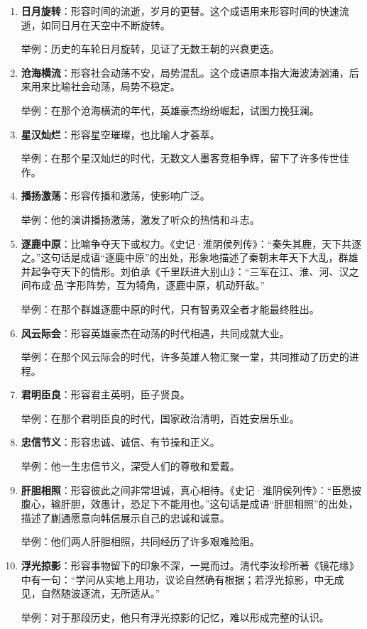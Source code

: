 \begin{enumerate}[leftmargin=*]
    \item \textbf{日月旋转}：形容时间的流逝，岁月的更替。这个成语用来形容时间的快速流逝，如同日月在天空中不断旋转。
    
    举例：历史的车轮日月旋转，见证了无数王朝的兴衰更迭。
    
    \item \textbf{沧海横流}：形容社会动荡不安，局势混乱。这个成语原本指大海波涛汹涌，后来用来比喻社会动荡，局势不稳定。
    
    举例：在那个沧海横流的年代，英雄豪杰纷纷崛起，试图力挽狂澜。
    
    \item \textbf{星汉灿烂}：形容星空璀璨，也比喻人才荟萃。
    
    举例：在那个星汉灿烂的时代，无数文人墨客竞相争辉，留下了许多传世佳作。
    
    \item \textbf{播扬激荡}：形容传播和激荡，使影响广泛。
    
    举例：他的演讲播扬激荡，激发了听众的热情和斗志。
    
    \item \textbf{逐鹿中原}：比喻争夺天下或权力。《史记·淮阴侯列传》：“秦失其鹿，天下共逐之。”这句话是成语“逐鹿中原”的出处，形象地描述了秦朝末年天下大乱，群雄并起争夺天下的情形。刘伯承《千里跃进大别山》：“三军在江、淮、河、汉之间布成‘品’字形阵势，互为犄角，逐鹿中原，机动歼敌。”
    
    举例：在那个群雄逐鹿中原的时代，只有智勇双全者才能最终胜出。
    
    \item \textbf{风云际会}：形容英雄豪杰在动荡的时代相遇，共同成就大业。
    
    举例：在那个风云际会的时代，许多英雄人物汇聚一堂，共同推动了历史的进程。
    
    \item \textbf{君明臣良}：形容君主英明，臣子贤良。
    
    举例：在那个君明臣良的时代，国家政治清明，百姓安居乐业。
    
    \item \textbf{忠信节义}：形容忠诚、诚信、有节操和正义。
    
    举例：他一生忠信节义，深受人们的尊敬和爱戴。
    
    \item \textbf{肝胆相照}：形容彼此之间非常坦诚，真心相待。《史记·淮阴侯列传》：“臣愿披腹心，输肝胆，效愚计，恐足下不能用也。”这句话是成语“肝胆相照”的出处，描述了蒯通愿意向韩信展示自己的忠诚和诚意。
    
    举例：他们两人肝胆相照，共同经历了许多艰难险阻。
    
    \item \textbf{浮光掠影}：形容事物留下的印象不深，一晃而过。清代李汝珍所著《镜花缘》中有一句：“学问从实地上用功，议论自然确有根据；若浮光掠影，中无成见，自然随波逐流，无所适从。”
    
    举例：对于那段历史，他只有浮光掠影的记忆，难以形成完整的认识。
\end{enumerate}

